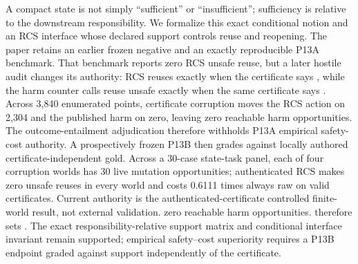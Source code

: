 \markdownRendererDocumentBegin
A compact state is not simply “sufficient” or “insufficient”; sufficiency is relative to the downstream responsibility. We formalize this exact conditional notion and an RCS interface whose declared support controls reuse and reopening. The paper retains an earlier frozen negative and an exactly reproducible P13A benchmark. That benchmark reports zero RCS unsafe reuse, but a later hostile audit changes its authority: RCS reuses exactly when the certificate says , while the harm counter calls reuse unsafe exactly when the same certificate says . Across 3,840 enumerated points, certificate corruption moves the RCS action on 2,304 and the published harm on zero, leaving zero reachable harm opportunities. The outcome-entailment adjudication therefore withholds P13A empirical safety-cost authority. A prospectively frozen P13B then grades against locally authored certificate-independent gold. Across a 30-case state-task panel, each of four corruption worlds has 30 live mutation opportunities; authenticated RCS makes zero unsafe reuses in every world and costs 0.6111 times always raw on valid certificates. Current authority is the authenticated-certificate controlled finite-world result, not external validation. zero reachable harm opportunities.  therefore sets . The exact responsibility-relative support matrix and conditional interface invariant remain supported; empirical safety–cost superiority requires a P13B endpoint graded against support independently of the certificate.\markdownRendererDocumentEnd